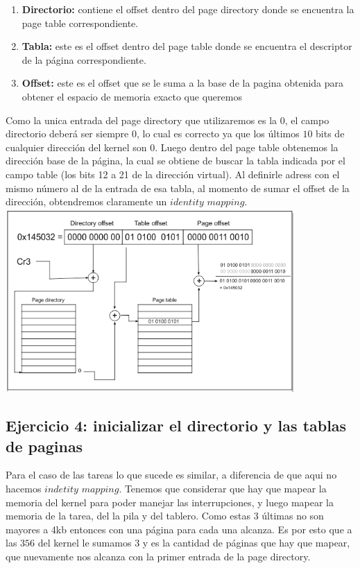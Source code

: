 \documentclass[a4paper,10pt,twoside]{article}
\begin{document}
\begin{enumerate}
 \item \textbf{Directorio:} contiene el offset dentro del page directory donde se encuentra la page table correspondiente.
 \item \textbf{Tabla:} este es el offset dentro del page table donde se encuentra el descriptor de la página correspondiente.
 \item \textbf{Offset:} este es el offset que se le suma a la base de la pagina obtenida para obtener el espacio de memoria exacto que queremos
\end{enumerate}

Como la unica entrada del page directory que utilizaremos es la $0$, el campo directorio deberá ser siempre $0$, lo cual es correcto ya que los últimos $10$ bits de cualquier dirección del kernel son $0$. Luego dentro del page table obtenemos la dirección base de la página, la cual se obtiene de buscar la tabla indicada por el campo table (los bits 12 a 21 de la dirección virtual). Al definirle adress con el mismo número al de la entrada de esa tabla, al momento de sumar el offset de la dirección, obtendremos claramente un $identity$ $mapping$. \\

\includegraphics[height=7cm]{iddMap.png}

\subsection{Ejercicio 4: inicializar el directorio y las tablas de paginas}

Para el caso de las tareas lo que sucede es similar, a diferencia de que aqui no hacemos $indetity$ $mapping$. 
Tenemos que considerar que hay que mapear la memoria del kernel para poder manejar las interrupciones, y luego mapear la memoria de la tarea, del la pila y del tablero. Como estas $3$ últimas no son mayores a 4kb entonces con una página para cada una alcanza. Es por esto que a las $356$ del kernel le sumamos $3$ y es la cantidad de páginas que hay que mapear, que nuevamente nos alcanza con la primer entrada de la page directory.
\end{document}
